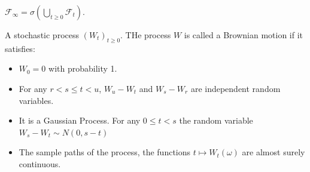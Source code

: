 $\mathcal{F}_\infty=\sigma\left( \bigcup_{t\ge 0} \mathcal{F}_t \right) $.
\begin{definition}
  A stochastic process ${\left( W_t \right)}_{t\ge 0} $. THe process $W$ is
  called a Brownian motion if it satisfies:
  \begin{itemize}
    \item $W_0=0$ with probability 1.
    \item For any $r<s\le t<u$, $W_u-W_t$ and $W_s-W_r$ are independent random variables.
    \item It is a Gaussian Process. For any $0\le t<s$ the random variable $W_s-W_t\sim N(0,s-t)$
    \item The sample paths of the process, the functions $t\mapsto W_t\left(
      \omega \right) $ are almost surely continuous.
  \end{itemize}
\end{definition}
